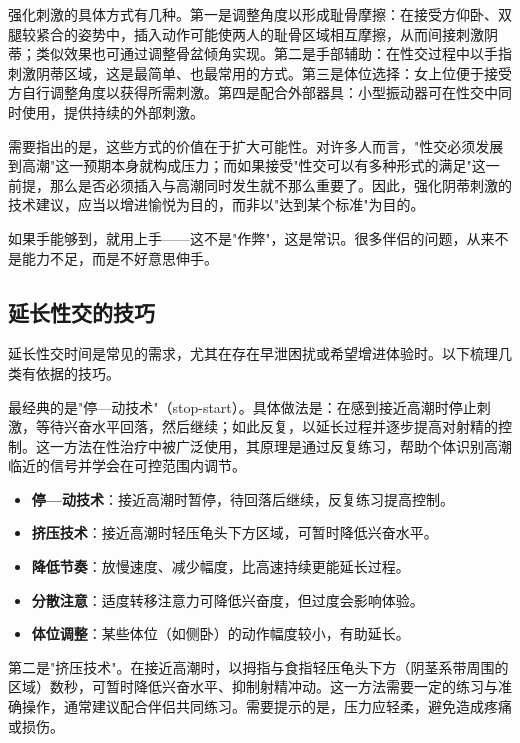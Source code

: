 \documentclass[12pt,UTF8]{ctexbook}
\newcommand{\keyword}[1]{\textbf{#1}}
\begin{document}
强化刺激的具体方式有几种。第一是调整角度以形成耻骨摩擦：在接受方仰卧、双腿较紧合的姿势中，插入动作可能使两人的耻骨区域相互摩擦，从而间接刺激阴蒂；类似效果也可通过调整骨盆倾角实现。第二是手部辅助：在性交过程中以手指刺激阴蒂区域，这是最简单、也最常用的方式。第三是体位选择：女上位便于接受方自行调整角度以获得所需刺激。第四是配合外部器具：小型振动器可在性交中同时使用，提供持续的外部刺激。

需要指出的是，这些方式的价值在于扩大可能性。对许多人而言，"性交必须发展到高潮"这一预期本身就构成压力；而如果接受"性交可以有多种形式的满足"这一前提，那么是否必须插入与高潮同时发生就不那么重要了。因此，强化阴蒂刺激的技术建议，应当以增进愉悦为目的，而非以"达到某个标准"为目的。

\begin{tcolorbox}[colback=pink!5!white,colframe=red!50!black,title=贴心小叮咛]
如果手能够到，就用上手——这不是"作弊"，这是常识。很多伴侣的问题，从来不是能力不足，而是不好意思伸手。
\end{tcolorbox}
\subsection{延长性交的技巧}

延长性交时间是常见的需求，尤其在存在早泄困扰或希望增进体验时。以下梳理几类有依据的技巧。

最经典的是"停—动技术"（stop-start）。具体做法是：在感到接近高潮时停止刺激，等待兴奋水平回落，然后继续；如此反复，以延长过程并逐步提高对射精的控制。这一方法在性治疗中被广泛使用，其原理是通过反复练习，帮助个体识别高潮临近的信号并学会在可控范围内调节。

\begin{itemize}
  \item \keyword{停—动技术}：接近高潮时暂停，待回落后继续，反复练习提高控制。
  \item \keyword{挤压技术}：接近高潮时轻压龟头下方区域，可暂时降低兴奋水平。
  \item \keyword{降低节奏}：放慢速度、减少幅度，比高速持续更能延长过程。
  \item \keyword{分散注意}：适度转移注意力可降低兴奋度，但过度会影响体验。
  \item \keyword{体位调整}：某些体位（如侧卧）的动作幅度较小，有助延长。
\end{itemize}

第二是"挤压技术"。在接近高潮时，以拇指与食指轻压龟头下方（阴茎系带周围的区域）数秒，可暂时降低兴奋水平、抑制射精冲动。这一方法需要一定的练习与准确操作，通常建议配合伴侣共同练习。需要提示的是，压力应轻柔，避免造成疼痛或损伤。
\end{document}
